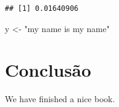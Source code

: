 \documentclass[
  12pt,
  brazil,
  a4paper,
  openany]{book}
\newenvironment{Shaded}{\begin{snugshade}}{\end{snugshade}}
\newcommand{\NormalTok}[1]{#1}
\newcommand{\StringTok}[1]{\textcolor[rgb]{0.31,0.60,0.02}{#1}}
\begin{document}
\begin{verbatim}
## [1] 0.01640906
\end{verbatim}

\begin{Shaded}
\begin{Highlighting}[]
\NormalTok{y \textless{}{-}}\StringTok{ "my name is my name"}
\end{Highlighting}
\end{Shaded}

\hypertarget{conclusuxe3o}{%
\chapter*{Conclusão}\label{conclusuxe3o}}

We have finished a nice book.

\printbibliography
\end{document}
